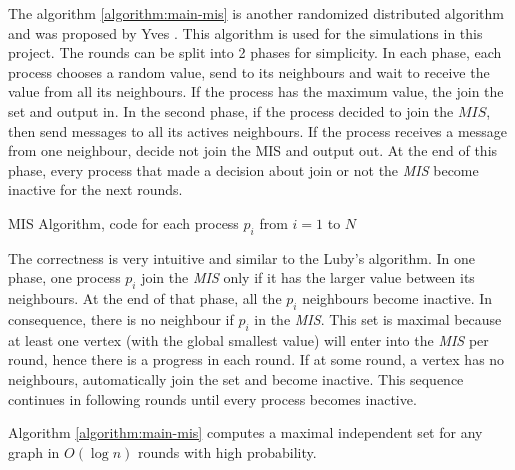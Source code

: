 The algorithm \ref{algorithm:main-mis} is another randomized distributed algorithm and was proposed by Yves \cite{yves2009optimal}. This algorithm is used for the simulations in this project. The rounds can be split into 2 phases for simplicity. In each phase, each process chooses a random value, send to its neighbours and wait to receive the value from all its neighbours. If the process has the maximum value, the join the set and output in. In the second phase, if the process decided to join the $MIS$, then send messages to all its actives neighbours. If the process receives a message from one neighbour, decide not join the MIS and output out. At the end of this phase, every process that made a decision about join or not the \textit{MIS} become inactive for the next rounds.

\begin{algorithm}
 \caption{MIS Algorithm, code for each process $p_i$ from $i = 1$ to $N$}
 \label{algorithm:main-mis} 

\SetAlgoNoLine
{}
\end{algorithm}


The correctness is very intuitive and similar to the Luby's algorithm. In one phase, one process $p_i$ join the \textit{MIS} only if it has the larger value between its neighbours. At the end of that phase, all the $p_i$ neighbours become inactive. In consequence, there is no neighbour if $p_i$ in the \textit{MIS}. This set is maximal because at least one vertex (with the global smallest value) will enter into the \textit{MIS} per round, hence there is a progress in each round. If at some round, a vertex has no neighbours, automatically join the set and become inactive. This sequence continues in following rounds until every process becomes inactive.

\begin{theorem}

Algorithm \ref{algorithm:main-mis} computes a maximal independent set for any graph in $O(\log n)$ rounds with high probability.

\end{theorem}


